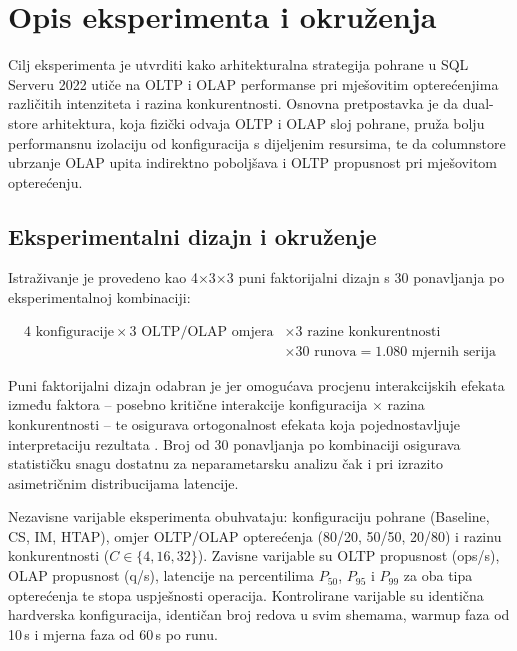 \chapter{Opis eksperimenta i okruženja}
\label{ch:eksperiment}

Cilj eksperimenta je utvrditi kako arhitekturalna strategija pohrane u SQL Serveru 2022 utiče na OLTP i OLAP performanse pri mješovitim opterećenjima različitih intenziteta i razina konkurentnosti. Osnovna pretpostavka je da dual-store arhitektura, koja fizički odvaja OLTP i OLAP sloj pohrane, pruža bolju performansnu izolaciju od konfiguracija s dijeljenim resursima, te da columnstore ubrzanje OLAP upita indirektno poboljšava i OLTP propusnost pri mješovitom opterećenju.

\section{Eksperimentalni dizajn i okruženje}
\label{sec:eksperimentalni_dizajn}
\label{sec:hardver}

Istraživanje je provedeno kao 4$\times$3$\times$3 puni faktorijalni dizajn s 30 ponavljanja po eksperimentalnoj kombinaciji:

\[
\begin{aligned}
4\text{ konfiguracije} \times 3\text{ OLTP/OLAP omjera} &\times 3\text{ razine konkurentnosti} \\
&\times 30\text{ runova} = 1.080\text{ mjernih serija}
\end{aligned}
\]

Puni faktorijalni dizajn odabran je jer omogućava procjenu interakcijskih efekata između faktora -- posebno kritične interakcije konfiguracija $\times$ razina konkurentnosti -- te osigurava ortogonalnost efekata koja pojednostavljuje interpretaciju rezultata \cite{zhang2024hybench}. Broj od 30 ponavljanja po kombinaciji osigurava statističku snagu dostatnu za neparametarsku analizu čak i pri izrazito asimetričnim distribucijama latencije.

Nezavisne varijable eksperimenta obuhvataju: konfiguraciju pohrane (Baseline, CS, IM, HTAP), omjer OLTP/OLAP opterećenja (80/20, 50/50, 20/80) i razinu konkurentnosti ($C\in\{4,16,32\}$). Zavisne varijable su OLTP propusnost (ops/s), OLAP propusnost (q/s), latencije na percentilima $P_{50}$, $P_{95}$ i $P_{99}$ za oba tipa opterećenja te stopa uspješnosti operacija. Kontrolirane varijable su identična hardverska konfiguracija, identičan broj redova u svim shemama, warmup faza od 10\,s i mjerna faza od 60\,s po runu.

